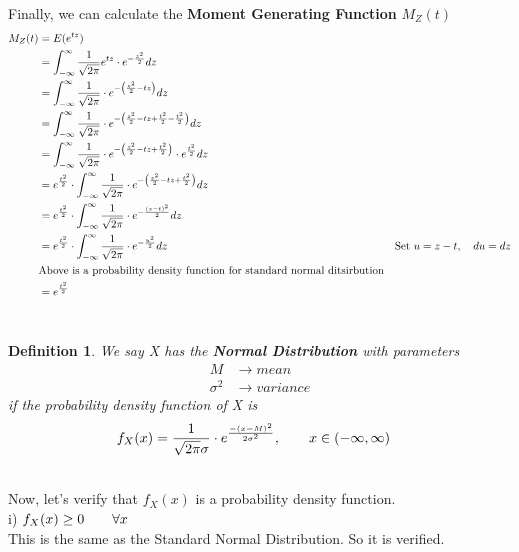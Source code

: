 \documentclass[11pt,oneside]{book}
\theoremstyle{break}
\theoremstyle{break}
\newtheorem{defn}{Definition}[corL]
\begin{document}
Finally, we can calculate the \textbf{Moment Generating Function} $M_Z(t)$\begin{align*}
M_Z(t)&=E(e^{tz})\\
&=\int_{-\infty}^{\infty}\frac{1}{\sqrt{2\pi}}e^{tz}\cdot e^{-\frac{z^2}{2}}dz\\
&=\int_{-\infty}^{\infty}\frac{1}{\sqrt{2\pi}}\cdot e^{-\left( \frac{z^2}{2}-tz\right)}dz\\
&=\int_{-\infty}^{\infty}\frac{1}{\sqrt{2\pi}}\cdot e^{-\left( \frac{z^2}{2}-tz+\frac{t^2}{2}-\frac{t^2}{2}\right)}dz\\
&=\int_{-\infty}^{\infty}\frac{1}{\sqrt{2\pi}}\cdot e^{-\left( \frac{z^2}{2}-tz+\frac{t^2}{2}\right)}\cdot e^{\frac{t^2}{2}}dz\\
&= e^{\frac{t^2}{2}}\cdot \int_{-\infty}^{\infty}\frac{1}{\sqrt{2\pi}}\cdot e^{-\left( \frac{z^2}{2}-tz+\frac{t^2}{2}\right)}dz\\
&= e^{\frac{t^2}{2}}\cdot \int_{-\infty}^{\infty}\frac{1}{\sqrt{2\pi}}\cdot e^{- \frac{(z-t)^2}{2}}dz\\
&= e^{\frac{t^2}{2}}\cdot \int_{-\infty}^{\infty}\frac{1}{\sqrt{2\pi}}\cdot e^{- \frac{u^2}{2}}dz&\text{Set }u=z-t,\text{\quad}du=dz\\
&\text{Above is a probability density function for standard normal ditsirbution}\\
&= e^{\frac{t^2}{2}}
\end{align*}
\hfill\\
\color{black}
\begin{defn}
We say X has the \textbf{Normal Distribution} with parameters \begin{align*}
M&\rightarrow mean\\
\sigma^2&\rightarrow variance
\end{align*}
if the probability density function of X is \begin{align*}
f_X(x)&=\frac{1}{\sqrt{2\pi}\sigma}\cdot e^{\frac{-(x-M)^2}{2\sigma^2}},\text{\qquad}x\in (-\infty,\infty)
\end{align*}
\end{defn}
\hfill\\
Now, let's verify that $f_X(x)$ is a probability density function.\\
i) $f_X(x)\geq 0 \text{\qquad} \forall x$\\
This is the same as the Standard Normal Distribution. So it is verified.\\
\hfill\\
\end{document}
